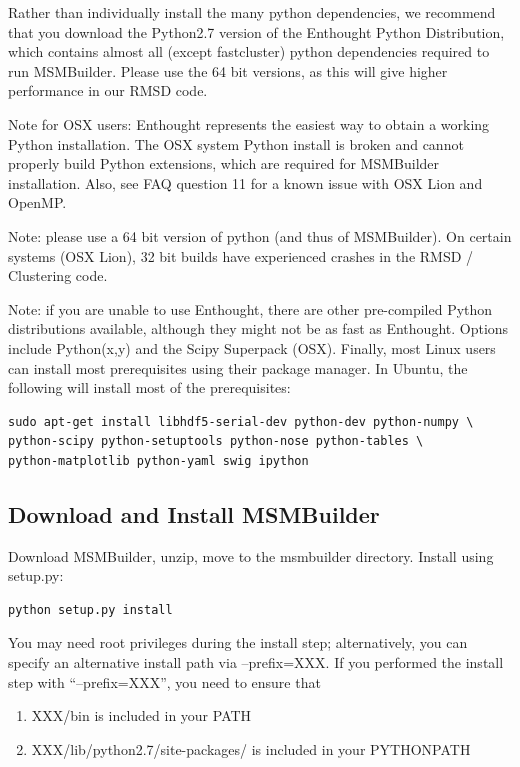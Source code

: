 \documentclass[12pt]{article}
\begin{document}
Rather than individually install the many python dependencies, we recommend that you download the Python2.7 version of the Enthought Python Distribution, which contains almost all (except fastcluster) python dependencies required to run MSMBuilder.  Please use the 64 bit versions, as this will give higher performance in our RMSD code.

Note for OSX users: Enthought represents the easiest way to obtain a working Python installation.  The OSX system Python install is broken and cannot properly build Python extensions, which are required for MSMBuilder installation.  Also, see FAQ question 11 for a known issue with OSX Lion and OpenMP.  

Note: please use a 64 bit version of python (and thus of MSMBuilder).  On certain systems (OSX Lion), 32 bit builds have experienced crashes in the RMSD / Clustering code.

Note: if you are unable to use Enthought, there are other pre-compiled Python distributions available, although they might not be as fast as Enthought.  Options include Python(x,y) and the Scipy Superpack (OSX).  Finally, most Linux users can install most prerequisites using their package manager.  In Ubuntu, the following will install most of the prerequisites:

\begin{verbatim}
sudo apt-get install libhdf5-serial-dev python-dev python-numpy \
python-scipy python-setuptools python-nose python-tables \
python-matplotlib python-yaml swig ipython
\end{verbatim}


\subsection{Download and Install MSMBuilder}

Download MSMBuilder, unzip, move to the msmbuilder directory.  Install using setup.py:
\begin{verbatim}
python setup.py install
\end{verbatim}

You may need root privileges during the install step; alternatively, you can specify an alternative install path via --prefix=XXX.  If you performed the install step with “--prefix=XXX”, you need to ensure that
\begin{enumerate}
 \item XXX/bin is included in your PATH
 \item XXX/lib/python2.7/site-packages/ is included in your PYTHONPATH
\end{enumerate}
\end{document}
